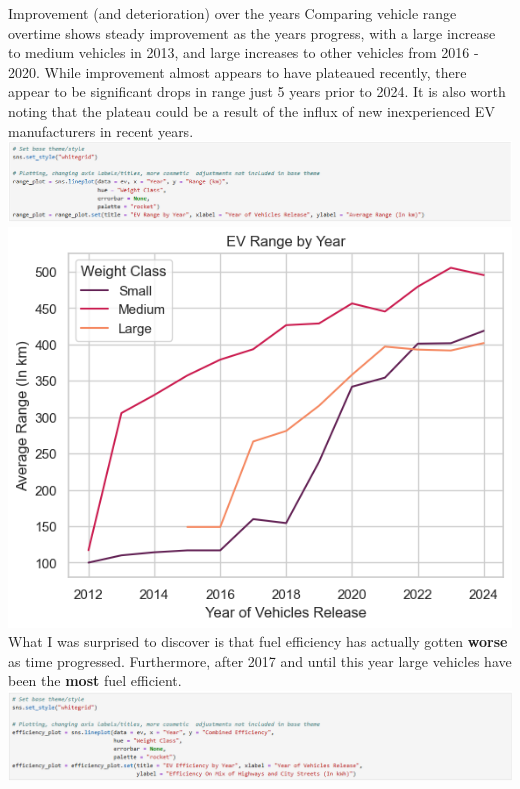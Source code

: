 \documentclass{article}
\begin{document}
{  \newline \newline
  \large Improvement (and deterioration) over the years
  \newline \newline
  \normalsize Comparing vehicle range overtime shows steady improvement as the years progress, with a large increase to medium
  vehicles in 2013, and large increases to other vehicles from 2016 - 2020. While improvement almost appears to have plateaued
  recently, there appear to be significant drops in range just 5 years prior to 2024. It is also worth noting that the plateau
  could be a result of the influx of new inexperienced EV manufacturers in recent years.
  \newline \newline
  \includegraphics[width=\textwidth]{code_05.png}
  \includegraphics{graph_03.png}
  \newpage
  What I was surprised to discover is that fuel efficiency has actually gotten \textbf{worse} as time progressed. Furthermore,
  after 2017 and until this year large vehicles have been the \textbf{most} fuel efficient.
  \newline \newline
  \includegraphics[width=\textwidth]{code_06.png}
}
\end{document}
